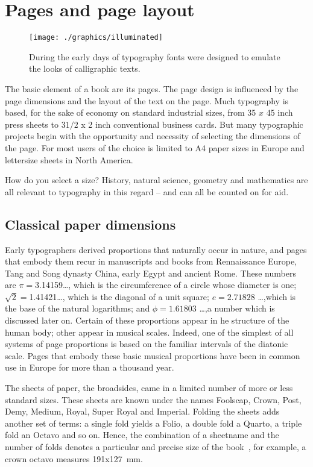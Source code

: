 \chapter{Pages and page layout}
\setlength{\parindent}{1em}
\begin{wrapfigure}{L}{5cm}%
  \texttt{[image: ./graphics/illuminated]}
  \caption{During the early days of typography fonts were designed to emulate the looks of calligraphic texts.}
  \label{fig:marginfig1}
\end{wrapfigure}

The basic element of a book are its pages. The page design is influenced by the page dimensions and the layout of the text on the page.  Much typography is based, for the sake of economy on standard industrial sizes, from 35 $x$ 45 inch press sheets to $3 1/2$ x 2 inch conventional business cards.  But many typographic projects begin with the opportunity and necessity of selecting the dimensions of the page. For most users of \alltex the choice is limited to A4 paper sizes in Europe and lettersize sheets in North America. 

How do you select a size? History, natural science, geometry and mathematics
are all relevant to typography in this regard -- and can all be counted on for aid.

\section{Classical paper dimensions}

Early typographers derived proportions that naturally occur in nature, and pages that embody
them recur in manuscripts and books from Rennaissance Europe, Tang and Song dynasty
China, early Egypt and ancient Rome.  These numbers are $\pi=$3.14159\ldots , which is the circumference of a circle whose diameter
is one; $\sqrt{2}=$1.41421\ldots , which is the diagonal of a unit square; 
$e=2.71828$  \ldots ,which is the base of the natural logarithms; and $\phi=1.61803$ \ldots ,a number which is discussed later on. Certain of these proportions appear in he structure of the human body; other appear in musical scales. Indeed, one of the simplest of all systems of 
page proportions is based on the familiar intervals of the diatonic scale. Pages that
embody these basic musical proportions have been in common use in Europe for more than a thousand year.

 The sheets of paper, the broadsides, came in a limited number of more or less
 standard sizes. These sheets are known under the names Foolscap, Crown, 
 Post, Demy, Medium, Royal, Super Royal and Imperial. Folding the sheets
 adds another set of terms: a single fold yields a Folio, a double fold a
 Quarto, a triple fold an Octavo and so on. Hence, the combination of a
 sheetname and the number of folds denotes a particular and precise size of
 the book~\cite{town,williamson66}, for example, a crown octavo measures
 191x127~mm.


